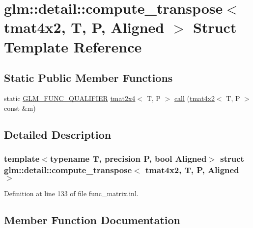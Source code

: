 \hypertarget{structglm_1_1detail_1_1compute__transpose_3_01tmat4x2_00_01_t_00_01_p_00_01_aligned_01_4}{}\section{glm\+::detail\+::compute\+\_\+transpose$<$ tmat4x2, T, P, Aligned $>$ Struct Template Reference}
\label{structglm_1_1detail_1_1compute__transpose_3_01tmat4x2_00_01_t_00_01_p_00_01_aligned_01_4}
\subsection*{Static Public Member Functions}
\begin{DoxyCompactItemize}
\item 
static \mbox{\hyperlink{setup_8hpp_a33fdea6f91c5f834105f7415e2a64407}{G\+L\+M\+\_\+\+F\+U\+N\+C\+\_\+\+Q\+U\+A\+L\+I\+F\+I\+ER}} \mbox{\hyperlink{structglm_1_1tmat2x4}{tmat2x4}}$<$ T, P $>$ \mbox{\hyperlink{structglm_1_1detail_1_1compute__transpose_3_01tmat4x2_00_01_t_00_01_p_00_01_aligned_01_4_a12641dcca503b13c30be88f020019308}{call}} (\mbox{\hyperlink{structglm_1_1tmat4x2}{tmat4x2}}$<$ T, P $>$ const \&m)
\end{DoxyCompactItemize}


\subsection{Detailed Description}
\subsubsection*{template$<$typename T, precision P, bool Aligned$>$\newline
struct glm\+::detail\+::compute\+\_\+transpose$<$ tmat4x2, T, P, Aligned $>$}



Definition at line 133 of file func\+\_\+matrix.\+inl.



\subsection{Member Function Documentation}
\mbox{\label{structglm_1_1detail_1_1compute__transpose_3_01tmat4x2_00_01_t_00_01_p_00_01_aligned_01_4_a12641dcca503b13c30be88f020019308}} 
